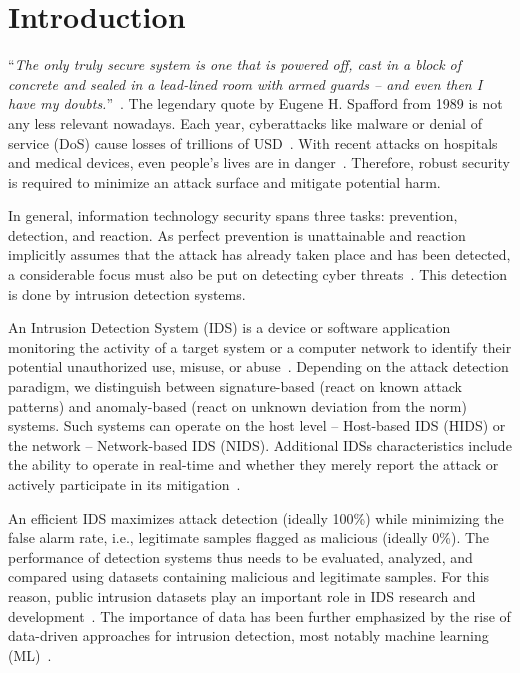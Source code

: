 
\section{Introduction}
\label{sec:intro}

``\emph{The only truly secure system is one that is powered off, cast in a block of concrete and sealed in a lead-lined room with armed guards -- and even then I have my doubts.}''~\cite{dewdney1989_comp_recreations}. The legendary quote by Eugene H. Spafford from 1989 is not any less relevant nowadays. Each year, cyberattacks like malware or denial of service (DoS) cause losses of trillions of USD~\cite{esentire_cybercrime_2024_report}. With recent attacks on hospitals and medical devices, even people's lives are in
danger~\cite{papaioannou2020_survey_threats_iomt}. Therefore, robust security is required to minimize an attack surface and mitigate potential harm.

In general, information technology security spans three tasks: prevention, detection, and reaction. As perfect prevention is unattainable and reaction implicitly assumes that the attack has already taken place and has been detected, a considerable focus must also be put on detecting cyber threats~\cite{apruzzese2023_sok_pragmatic}. This detection is done by intrusion detection systems.

An Intrusion Detection System (IDS) is a device or software application monitoring the activity of a target system or a computer network to identify their potential unauthorized use, misuse, or abuse~\cite{mukherjee1994_nids}. Depending on the attack detection paradigm, we distinguish between signature-based (react on known attack patterns) and anomaly-based (react on unknown deviation from the norm) systems. Such systems can operate on the host level -- Host-based IDS (HIDS) or the network -- Network-based IDS (NIDS). Additional IDSs characteristics include the ability to operate in real-time and whether they merely report the attack or actively participate in its mitigation~\cite{thakkar2022_ids_survey, buczak2016_dm_ml_ids}.

An efficient IDS maximizes attack detection (ideally 100\%) while minimizing the false alarm rate, i.e., legitimate samples flagged as malicious (ideally 0\%). The performance of detection systems thus needs to be evaluated, analyzed, and compared using datasets containing malicious and legitimate samples. For this reason, public intrusion datasets play an important role in IDS research and development~\cite{flood2024_bad_design_smells_nids_datasets}.
The importance of data has been further emphasized by the rise of data-driven approaches for intrusion detection, most notably machine learning (ML)~\cite{boutaba2018_ml_networking_survey}.

